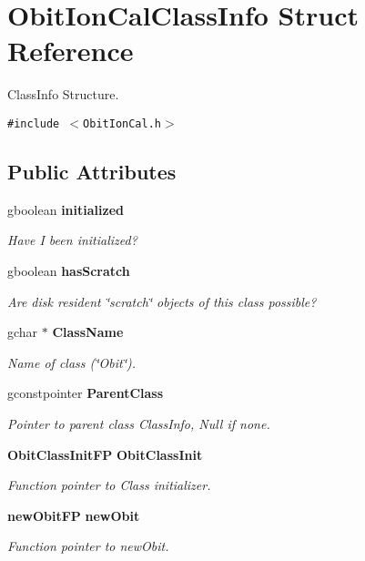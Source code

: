 \section{Obit\-Ion\-Cal\-Class\-Info Struct Reference}
\label{structObitIonCalClassInfo}
Class\-Info Structure.  


{\tt \#include $<$Obit\-Ion\-Cal.h$>$}

\subsection*{Public Attributes}
\begin{CompactItemize}
\item 
gboolean {\bf initialized}
\begin{CompactList}\small\item\em Have I been initialized? \item\end{CompactList}\item 
gboolean {\bf has\-Scratch}
\begin{CompactList}\small\item\em Are disk resident \char`\"{}scratch\char`\"{} objects of this class possible? \item\end{CompactList}\item 
gchar $\ast$ {\bf Class\-Name}
\begin{CompactList}\small\item\em Name of class (\char`\"{}Obit\char`\"{}). \item\end{CompactList}\item 
gconstpointer {\bf Parent\-Class}
\begin{CompactList}\small\item\em Pointer to parent class Class\-Info, Null if none. \item\end{CompactList}\item 
{\bf Obit\-Class\-Init\-FP} {\bf Obit\-Class\-Init}
\begin{CompactList}\small\item\em Function pointer to Class initializer. \item\end{CompactList}\item 
{\bf new\-Obit\-FP} {\bf new\-Obit}
\begin{CompactList}\small\item\em Function pointer to new\-Obit. \item\end{CompactList}\item 

\end{CompactItemize}
